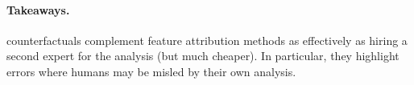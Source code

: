 \paragraph{Takeaways.}
\sysname counterfactuals complement feature attribution methods as effectively as hiring a second expert for the analysis (but much cheaper).
In particular, they highlight errors where humans may be misled by their own analysis.

